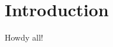 \documentclass[11pt,a4paper]{article}
\begin{document}
\section{Introduction}
Howdy all!
\end{document}

